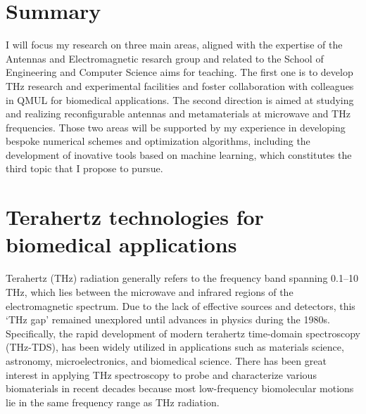 \documentclass[11pt]{academia}
\begin{document}

\vspace*{1cm }
\newrefsection
\section{Summary}


I will focus my research on three main areas, 
aligned with the expertise of the Antennas and Electromagnetic resarch group 
and related  to the School of Engineering and Computer Science aims for teaching. 
The first one is to develop THz research and experimental facilities and foster collaboration with 
colleagues in QMUL for biomedical applications. The second direction is aimed 
at studying and realizing reconfigurable antennas and metamaterials at 
microwave and THz frequencies. Those two areas will be supported by my 
experience in developing bespoke numerical schemes and optimization 
algorithms, including the development of inovative tools based on machine 
learning, which constitutes the third topic that I propose to pursue.


\vspace*{1cm }

\section{Terahertz technologies for biomedical applications}



Terahertz (THz) radiation generally refers to the frequency band spanning 0.1–10 THz, which lies between
the microwave and infrared regions of the electromagnetic spectrum. Due to the lack of
effective sources and detectors, this ‘THz gap’ remained
unexplored until advances in physics during the 1980s. 
Specifically, the rapid development of modern terahertz time-domain spectroscopy
(THz-TDS), has been widely utilized in applications such as materials
science, astronomy, microelectronics, and biomedical science\autocite{dhillon2017TerahertzScience2017}.
There has been great interest in applying THz spectroscopy to probe and characterize various 
biomaterials in recent decades because most low-frequency biomolecular motions 
lie in the same frequency range as THz radiation\autocite{sunRecentAdvancesTerahertz2017}.
\end{document}
